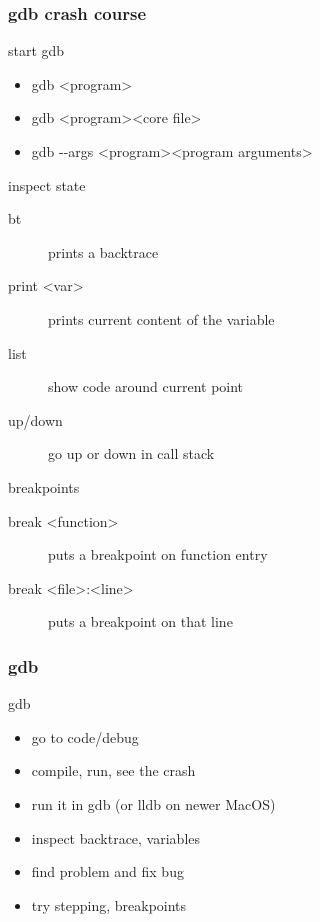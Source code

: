 \begin{frame}[fragile]
  \frametitle{gdb crash course}
  \begin{block}{start gdb}
    \begin{itemize}
    \item gdb \textless{}program\textgreater
    \item gdb \textless{}program\textgreater \textless{}core file\textgreater
    \item gdb -{}-args \textless{}program\textgreater \textless{}program arguments\textgreater
    \end{itemize}
  \end{block}
  \begin{block}{inspect state}
    \begin{description}
    \item[bt] prints a backtrace
    \item[print \textless{}var\textgreater] prints current content of the variable
    \item[list] show code around current point
    \item[up/down] go up or down in call stack
    \end{description}
  \end{block}
  \begin{block}{breakpoints}
    \begin{description}
    \item[break \textless{}function\textgreater] puts a breakpoint on function entry
    \item[break \textless{}file\textgreater:\textless{}line\textgreater] puts a breakpoint on that line
    \end{description}
  \end{block}
\end{frame}

\begin{frame}[fragile]
  \frametitle{gdb}
  \begin{exercise}{gdb}
    \begin{itemize}
    \item go to code/debug
    \item compile, run, see the crash
    \item run it in gdb (or lldb on newer MacOS)
    \item inspect backtrace, variables
    \item find problem and fix bug
    \item try stepping, breakpoints
    \end{itemize}
  \end{exercise}
\end{frame}

